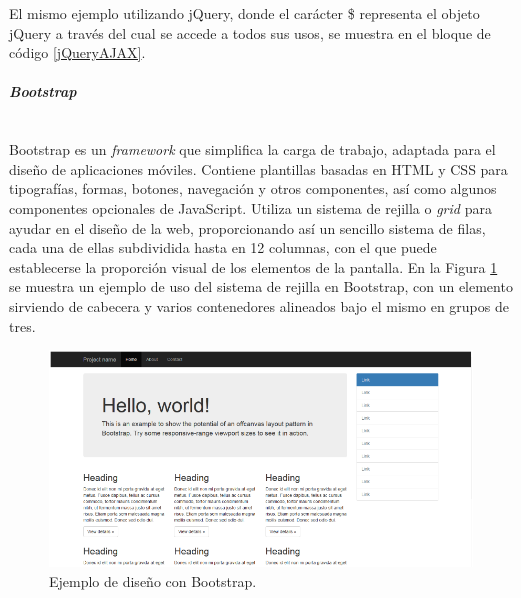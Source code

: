 El mismo ejemplo utilizando jQuery, donde el carácter \$ representa el objeto jQuery a través del cual se accede a todos sus usos, se muestra en el bloque de código \ref{jQueryAJAX}.


\paragraph{\emph{Bootstrap}} ~\\

Bootstrap es un \emph{framework} que simplifica la carga de trabajo, adaptada para el diseño de aplicaciones móviles. Contiene plantillas basadas en HTML y CSS para tipografías, formas, botones, navegación y otros componentes, así como algunos componentes opcionales de JavaScript. Utiliza un sistema de rejilla o \emph{grid} para ayudar en el diseño de la web, proporcionando así un sencillo sistema de filas, cada una de ellas subdividida hasta en 12 columnas, con el que puede establecerse la proporción visual de los elementos de la pantalla. En la Figura \ref{gridBootstrap} se muestra un ejemplo de uso del sistema de rejilla en Bootstrap, con un elemento sirviendo de cabecera y varios contenedores alineados bajo el mismo en grupos de tres.

\begin{figure}[!t]
\begin{center}
\includegraphics[width=0.75\linewidth]{./3_Tecnologias/Img/gridBootstrap.png}
\end{center}
\caption{Ejemplo de diseño con Bootstrap.}
\label{gridBootstrap}
\end{figure}